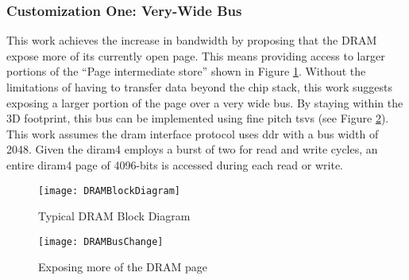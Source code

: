 \subsubsection{Customization One: Very-Wide Bus}
\label{sec:Very-Wide Bus}

This work achieves the increase in bandwidth by proposing that the DRAM expose more of its currently open page. This means providing access to larger portions of the ``Page intermediate store'' shown in Figure \ref{fig:dramBlockDiagram}.
Without the limitations of having to transfer data beyond the chip stack, this work suggests exposing a larger portion of the page over a very wide bus. 
By staying within the 3D footprint, this bus can be implemented using fine pitch \acp{tsv} (see Figure \ref{fig:dramBusChange}).
This work assumes the \ac{dram} interface protocol uses \ac{ddr} with a bus width of 2048. Given the \ac{diram4} employs a burst of two for read and write cycles, an entire \ac{diram4} page of 4096-bits is accessed during each read or write. 
\begin{figure}[!t]
\centering
\captionsetup{justification=centering}
\centerline{
\mbox{\texttt{[image: DRAMBlockDiagram]}}
}
\caption{Typical DRAM Block Diagram \cite{micron_ddr3}}
\label{fig:dramBlockDiagram}
\end{figure}

\begin{figure}[!t]
\centering
\captionsetup{justification=centering}
\captionsetup{width=.75\linewidth}
\centerline{
\mbox{\texttt{[image: DRAMBusChange]}}
}
\caption{Exposing more of the DRAM page}
\label{fig:dramBusChange}
\end{figure}


